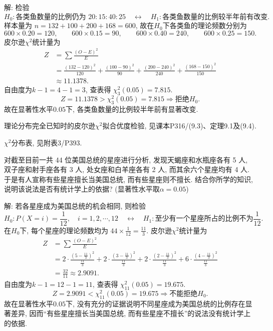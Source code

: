 \documentclass[standard]{ExBook}
\renewenvironment{shaded}{%
  \def\FrameCommand{\fboxsep=\FrameSep \colorbox{shadecolor}}%
  \MakeFramed{\advance\hsize-\width \FrameRestore}%
}{%
  \endMakeFramed
}
\begin{document}
\begin{qitems}
\vspace{\dimexpr2.5cm-5em\relax}

解: 检验
$$
H_0:\text{各类鱼数量的比例仍为 }20:15:40:25
\quad\leftrightarrow\quad
H_1:\text{各类鱼数量的比例较半年前有改变}.
$$
样本量为
$
n=132+100+200+168=600
$,
故在$H_0$下各类鱼的理论频数分别为
$$
600\times0.20=120,\qquad
600\times0.15=90,\qquad
600\times0.40=240,\qquad
600\times0.25=150.
$$
皮尔逊$\chi^2$统计量为
$$
\begin{aligned}
Z
&=\sum\frac{(O-E)^2}{E}\\
&=\frac{(132-120)^2}{120}
+\frac{(100-90)^2}{90}
+\frac{(200-240)^2}{240}
+\frac{(168-150)^2}{150}\\
&\approx11.1378.
\end{aligned}
$$
自由度为$k-1=4-1=3$, 查表得
$
\chi_3^2(0.05)=7.815
$.
$$
Z=11.1378>\chi_3^2(0.05)=7.815
\Longrightarrow
\text{拒绝}H_0.
$$
故在显著性水平$0.05$下, 各类鱼数量的比例较半年前有显著改变.

\textcolor{themeColor}{\selectfont {} 理论分布完全已知时的皮尔逊$\chi^2$拟合优度检验, 见课本P316/(9.3)、定理9.1及(9.4).}

\textcolor{themeColor}{\selectfont {} $\chi^2$分布表, 见附表3/P393.}

\vspace{2.5cm-5em}

    \begin{bbox}
    \begin{shaded}
        \qitem
对截至目前一共 44 位美国总统的星座进行分析, 发现天蝎座和水瓶座各有 5 人, 双子座和射手座各有 3 人, 处女座和白羊座各有 2 人, 而其余六个星座均有 4 人. 于是有人宣称有些星座擅长当美国总统, 而有些星座则不擅长. 结合你所学的知识, 说明该说法是否有统计学上的依据? (显著性水平取$\alpha=0.05$)
    \end{shaded}
    \end{bbox}

\vspace{\dimexpr2.5cm-5em\relax}

解: 若各星座成为美国总统的机会相同, 则检验
$$
H_0:P(X=i)=\frac{1}{12},\quad i=1,2,\cdots,12
\quad\leftrightarrow\quad
H_1:\text{至少有一个星座所占的比例不为}\frac{1}{12}.
$$
在$H_0$下, 每个星座的理论频数均为
$
44\times\frac{1}{12}=\frac{11}{3}
$.
皮尔逊$\chi^2$统计量为
$$
\begin{aligned}
Z
&=\sum\frac{(O-E)^2}{E}\\
&=
2\cdot\frac{\left(5-\frac{11}{3}\right)^2}{\frac{11}{3}}
+2\cdot\frac{\left(3-\frac{11}{3}\right)^2}{\frac{11}{3}}
+2\cdot\frac{\left(2-\frac{11}{3}\right)^2}{\frac{11}{3}}
+6\cdot\frac{\left(4-\frac{11}{3}\right)^2}{\frac{11}{3}}\\
&=\frac{32}{11}
\approx2.9091.
\end{aligned}
$$
自由度为$k-1=12-1=11$, 查表得
$
\chi_{11}^2(0.05)=19.675
$.
$$
Z=2.9091<\chi_{11}^2(0.05)=19.675
\Longrightarrow
\text{不能拒绝}H_0.
$$
故在显著性水平$0.05$下, 没有充分的证据说明不同星座成为美国总统的比例存在显著差异, 因而“有些星座擅长当美国总统, 而有些星座不擅长”的说法没有统计学上的依据.


\end{qitems}
\end{document}

